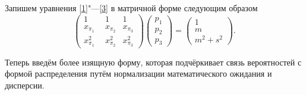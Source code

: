\documentclass[12pt]{article}
\begin{document}
	Запишем уравнения \eqref{1}"---\eqref{3} в матричной форме следующим образом
	\[\begin{pmatrix} 
		1&1&1\\ 
		x_{\pi_{1}} &  x_{\pi_{2}}  & x_{\pi_{3}} \\ 
		x_{\pi_{1}}^2~~&x_{\pi_{2}}^2  &x_{\pi_{3}}^2
	\end{pmatrix}
	\begin{pmatrix}p_{1}\\p_{2}\\ p_{3}\end{pmatrix}= \begin{pmatrix}1\\m\\m^{2}+s^{2}\end{pmatrix}.\]
	
	Теперь введём более изящную форму, которая подчёркивает связь вероятностей с формой распределения путём нормализации математического ожидания и дисперсии.
	
\end{document}
